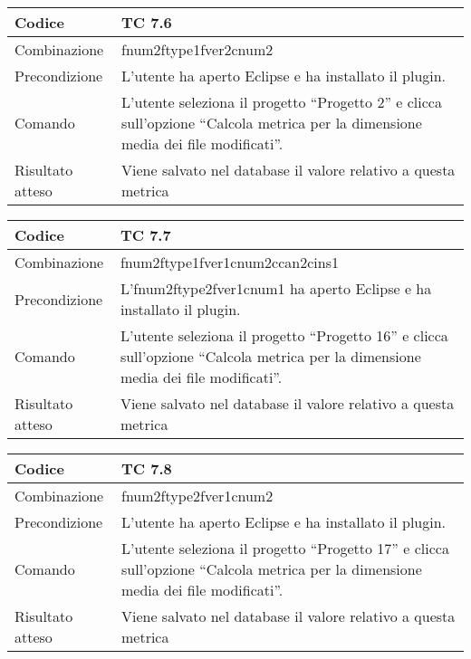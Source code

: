 \begin{table}[ht]
\begin{tabular}{|p{3cm}|p{9cm}|}
\hline
\cellcolor{lightgray}Codice				& TC 7.6								\\
\hline
\cellcolor{lightgray}Combinazione		& fnum2ftype1fver2cnum2								\\
\hline
\cellcolor{lightgray}Precondizione		& L'utente ha aperto Eclipse e ha installato il plugin.				\\
\hline
\cellcolor{lightgray}Comando			& L'utente seleziona il progetto ``Progetto 2''  e clicca sull'opzione ``Calcola metrica per la dimensione media dei file modificati''.	\\
\hline
\cellcolor{lightgray}Risultato atteso	& Viene salvato nel database il valore relativo a questa metrica	\\
\hline
\end{tabular}
\end{table}

\begin{table}[ht]
\begin{tabular}{|p{3cm}|p{9cm}|}
\hline
\cellcolor{lightgray}Codice				& TC 7.7								\\
\hline
\cellcolor{lightgray}Combinazione		& fnum2ftype1fver1cnum2ccan2cins1							\\
\hline
\cellcolor{lightgray}Precondizione		& L'fnum2ftype2fver1cnum1 ha aperto Eclipse e ha installato il plugin.									\\
\hline
\cellcolor{lightgray}Comando			& L'utente seleziona il progetto ``Progetto 16''  e clicca sull'opzione ``Calcola metrica per la dimensione media dei file modificati''.	\\
\hline
\cellcolor{lightgray}Risultato atteso	& Viene salvato nel database il valore relativo a questa metrica	\\
\hline
\end{tabular}
\end{table}

\begin{table}[ht]
\begin{tabular}{|p{3cm}|p{9cm}|}
\hline
\cellcolor{lightgray}Codice				& TC 7.8								\\
\hline
\cellcolor{lightgray}Combinazione		& fnum2ftype2fver1cnum2 									\\
\hline
\cellcolor{lightgray}Precondizione		& L'utente ha aperto Eclipse e ha installato il plugin.				\\
\hline
\cellcolor{lightgray}Comando			& L'utente seleziona il progetto ``Progetto 17''  e clicca sull'opzione ``Calcola metrica per la dimensione media dei file modificati''.	\\
\hline
\cellcolor{lightgray}Risultato atteso	& Viene salvato nel database il valore relativo a questa metrica	\\
\hline
\end{tabular}
\end{table}

